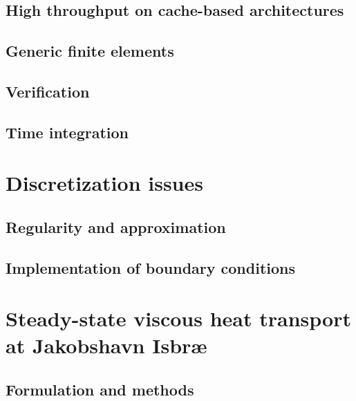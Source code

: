 \documentclass[a4paper,twoside,11pt,pdftex]{report}
\begin{document}
\section{High throughput on cache-based architectures}\label{sec:throughput}


\section{Generic finite elements}\label{sec:femassembly}


\section{Verification}\label{sec:verification}


\section{Time integration}\label{sec:timestep}


\cleardoublepage
\chapter{Discretization issues}\label{chap:discretization}

\section{Regularity and approximation}\label{sec:regularity}


\section{Implementation of boundary conditions}\label{sec:slip}


\cleardoublepage
% 

\chapter{Steady-state viscous heat transport at Jakobshavn Isbr{\ae}}\label{chap:jakobshavn}

\section{Formulation and methods}\label{sec:vht}

\end{document}
